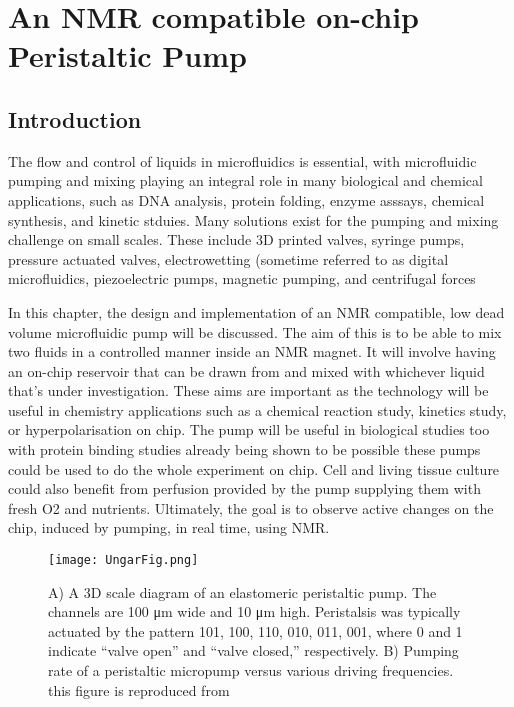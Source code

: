 
\chapter{An NMR compatible on-chip Peristaltic Pump}\label{Chapter:Peristaltics}

\section{Introduction}

The flow and control of liquids in microfluidics is essential, with microfluidic pumping
and mixing playing an integral role in many biological and chemical applications, such as
DNA analysis\citep{RN74, RN75}, protein folding\citep{RN76}, enzyme asssays\citep{RN77, RN78}, chemical synthesis\citep{RN79,RN80}, and kinetic stduies\citep{RN81, RN82}. Many solutions exist for the pumping and mixing challenge on small scales.
These include 3D printed valves\citep{RN83, RN84}, syringe pumps\citep{RN85,RN86,RN87}, pressure actuated valves\citep{RN88, RN89, RN90},
electrowetting (sometime referred to as digital microfluidics\citep{RN91, RN92}, piezoelectric pumps\citep{RN93, RN94}, magnetic pumping\citep{RN95,RN96}, and centrifugal forces\citep{RN97, RN98, RN99}

In this chapter, the design and implementation of an NMR compatible, low dead volume
microfluidic pump will be discussed. The aim of this is to be able to mix two fluids in a
controlled manner inside an NMR magnet. It will involve having an on-chip reservoir that
can be drawn from and mixed with whichever liquid that’s under investigation. These aims
are important as the technology will be useful in chemistry applications such as a chemical
reaction study, kinetics study, or hyperpolarisation on chip. The pump will be useful in
biological studies too with protein binding studies already being shown to be possible\citep{RN26}
these pumps could be used to do the whole experiment on chip. Cell and living tissue
culture could also benefit from perfusion provided by the pump supplying them with fresh O2
and nutrients. Ultimately, the goal is to observe active changes on the chip, induced by
pumping, in real time, using NMR.

\begin{figure}
\begin{center}
  \texttt{[image: UngarFig.png]}
\end{center}
  \caption{A) A 3D scale diagram of an elastomeric peristaltic pump. The channels are 100 μm wide and 10 μm high. Peristalsis was typically actuated by the pattern 101, 100, 110, 010, 011, 001, where 0 and 1 indicate “valve open” and “valve closed,” respectively. B) Pumping rate of a peristaltic micropump versus various driving frequencies. this
  figure is reproduced from\citep{RN59}}
  \label{fig:Ungar}
\end{figure}

